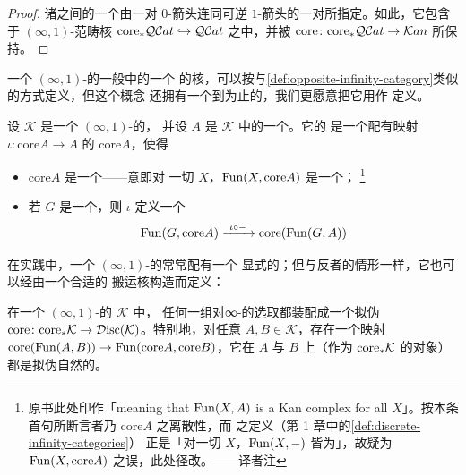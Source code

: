 \begin{proof}
诸\trQuasiCategory{}之间的一个\trEquivalence{}由一对 $0$-箭头连同可逆
$1$-箭头的一对所指定。如此，它包含于 $(\infty,1)$-范畴核
$\mathrm{core}_{\ast}\mathcal{Q}\mathcal{C}at\hookrightarrow\mathcal{Q}\mathcal{C}at$ 之中，并被\trSimplicialFunctor{}
$\mathrm{core}\colon\mathrm{core}_{\ast}\mathcal{Q}\mathcal{C}at\to\mathcal{K}an$ 所保持。
\end{proof}

一个 $(\infty,1)$-\trCategory{}的一般\trInfinityCosmos{}中的一个%
\trInfinityCategory{}的核，可以按与\cref{def:opposite-infinity-category}类似的方式定义，但这个概念
还拥有一个到\trEquivalence{}为止的\trUniversalProperty，我们更愿意把它用作
定义。

\begin{definition}\label{def:infinity-groupoid-core-cosmos}
设 $\mathcal{K}$ 是一个 $(\infty,1)$-\trCategory{}的\trInfinityCosmos{}，
并设 $A$ 是 $\mathcal{K}$ 中的一个\trInfinityCategory。它的%
\textbf{\trInfinityGroupoidCore}是一个配有映射 $\iota\colon\mathrm{core}A\to A$
的\trInfinityCategory{} $\mathrm{core}A$，使得
\begin{itemize}
\item $\mathrm{core}A$ 是一个\trDiscrete{}\trInfinityCategory——意即对
  一切 $X$，$\operatorname{Fun}(X,\mathrm{core}A)$ 是一个\trKanComplex；%
  \footnote{原书此处印作「meaning that $\operatorname{Fun}(X,A)$ is a Kan complex for all
  $X$」。按本条首句所断言者乃 $\mathrm{core}A$ 之离散性，而\trDiscrete{}%
  \trInfinityCategory{}之定义（第 1 章中的\cref{def:discrete-infinity-categories}）
  正是「对一切 $X$，$\operatorname{Fun}(X,-)$ 皆为\trKanComplex」，故疑为
  $\operatorname{Fun}(X,\mathrm{core}A)$ 之误，此处径改。——译者注}
\item 若 $G$ 是一个\trDiscrete{}\trInfinityCategory，则 $\iota$ 定义一个%
  \trEquivalence
\begin{equation*}
\Fun(G,\mathrm{core}A)\xrightarrow{\ \iota\circ-\ }\mathrm{core}(\Fun(G,A))
\end{equation*}
\end{itemize}
\end{definition}

在实践中，一个 $(\infty,1)$-\trCategory{}的\trInfinityCosmos{}常常配有一个
显式的\trCoreFunctor{}；但与反者的情形一样，它也可以经由一个合适的%
\trChangeOfModel{}\trFunctor{}搬运核构造而定义：

\begin{proposition}\label{prop:core-quasi-pseudofunctor}
在一个 $(\infty,1)$-\trCategory{}的\trInfinityCosmos{} $\mathcal{K}$ 中，
任何一组对∞-\trInfinityGroupoidCore{}的选取都装配成一个拟伪\trFunctor{}
$\mathrm{core}\colon\mathrm{core}_{\ast}\mathcal{K}\to\mathcal{D}\mathrm{isc}(\mathcal{K})$。特别地，对任意%
\trInfinityCategory{} $A,B\in\mathcal{K}$，存在一个映射
$\mathrm{core}(\operatorname{Fun}(A,B))\to\operatorname{Fun}(\mathrm{core}A,\mathrm{core}B)$，它在 $A$
与 $B$ 上（作为 $\mathrm{core}_{\ast}\mathcal{K}$ 的对象）都是拟伪自然的。
\end{proposition}

